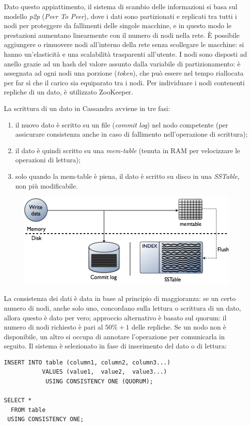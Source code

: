 \documentclass[a4page, 11pt]{article}
\begin{document}
Dato questo appiattimento, il sistema di scambio delle informazioni si basa sul modello \textit{p2p} (\textit{Peer To Peer}), dove i dati sono partizionati e replicati tra tutti i nodi per proteggere da fallimenti delle singole macchine, e in questo modo le prestazioni aumentano linearmente con il numero di nodi nella rete.
È possibile aggiungere o rimuovere nodi all'interno della rete senza scollegare le macchine: si hanno un'elasticità e una scalabilità trasparenti all'utente.
I nodi sono disposti ad anello grazie ad un hash del valore assunto dalla variabile di partizionamento: è assegnata ad ogni nodi una porzione (\textit{token}), che può essere nel tempo riallocata per far sì che il carico sia equiparato tra i nodi.
Per individuare i nodi contenenti repliche di un dato, è utilizzato ZooKeeper.

La scrittura di un dato in Cassandra avviene in tre fasi:
\begin{enumerate}
\item il nuovo dato è scritto su un file (\textit{commit log}) nel nodo competente (per assicurare consistenza anche in caso di fallimento nell'operazione di scrittura);
\item il dato è quindi scritto su una \textit{mem-table} (tenuta in RAM per velocizzare le operazioni di lettura);
\item solo quando la mem-table è piena, il dato è scritto su disco in una \textit{SSTable}, non più modificabile.
\end{enumerate}
  
\begin{figure}[h]
  \centering
  \includegraphics[width=100 mm]{cassandrawrite.png}
\end{figure}

La consistenza dei dati è data in base al principio di maggioranza: se un certo numero di nodi, anche solo uno, concordano sulla lettura o scrittura di un dato, allora questo è dato per vero; approccio alternativo è basato sul quorum: il numero di nodi richiesto è pari al $50\% + 1$ delle repliche.
Se un nodo non è disponibile, un altro si occupa di annotare l'operazione per comunicarla in seguito.
Il sistema è selezionato in fase di inserimento del dato o di lettura:
\begin{verbatim}
INSERT INTO table (column1, column2, column3...)
           VALUES (value1,  value2,  value3...)
            USING CONSISTENCY ONE (QUORUM);

SELECT *
  FROM table
 USING CONSISTENCY ONE;
\end{verbatim}
\end{document}
